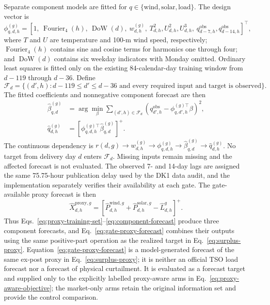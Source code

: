 \documentclass[11pt,a4paper]{article}
\begin{document}
Separate component models are fitted for
$q\in\{\mathrm{wind},\mathrm{solar},\mathrm{load}\}$.  The design vector is
\begin{equation}
  \phi^{(g)}_{q,d,h}
  =\left[1,\ \operatorname{Fourier}_4(h),\
  \operatorname{DoW}(d),\ w^{(g)}_{d,h},\
  T_{d,h}^{2},U_{d,h}^{2},U_{d,h}^{3},\
  q_{d-7,h}^{\mathrm{obs}},q_{d-14,h}^{\mathrm{obs}}\right]^{\!\top},
  \label{eq:proxy-feature-vector}
\end{equation}
where $T$ and $U$ are temperature and 100-m wind speed, respectively;
$\operatorname{Fourier}_4(h)$ contains sine and cosine terms for harmonics
one through four; and $\operatorname{DoW}(d)$ contains six weekday indicators
with Monday omitted.  Ordinary least squares is fitted only on the existing
84-calendar-day training window from $d-119$ through $d-36$.  Define
\begin{equation}
  \mathcal F_d
  =\{(d',h):d-119\leq d'\leq d-36
  \text{ and every required input and target is observed}\}.
  \label{eq:proxy-training-set}
\end{equation}
The fitted coefficients and nonnegative component forecast are then
\begin{align}
  \widehat\beta^{(g)}_{q,d}
  &=\arg\min_{\beta}\sum_{(d',h)\in\mathcal{F}_d}
  \left(q^{\mathrm{obs}}_{d',h}
  -\phi^{(g)\top}_{q,d',h}\beta\right)^2,
  \label{eq:component-ols}\\
  \widehat q^{(g)}_{d,h}
  &=\left[\phi^{(g)\top}_{q,d,h}
  \widehat\beta^{(g)}_{q,d}\right]^+.
  \label{eq:component-forecast}
\end{align}
The continuous dependency is
$r(d,g)\rightarrow w^{(g)}_{d,h}\rightarrow
\phi^{(g)}_{q,d,h}\rightarrow\widehat\beta^{(g)}_{q,d}\rightarrow
\widehat q^{(g)}_{d,h}$.  No target from delivery day $d$ enters
$\mathcal{F}_d$.  Missing inputs remain
missing and the affected forecast is not evaluated.  The observed 7- and
14-day lags are assigned the same 75.75-hour publication delay used by the DK1
data audit, and the implementation separately verifies their availability at
each gate.  The gate-available proxy
forecast is then
\begin{equation}
  \widehat X^{\mathrm{proxy},g}_{d,h}
  =\left[\widehat P^{\mathrm{wind},g}_{d,h}
  +\widehat P^{\mathrm{solar},g}_{d,h}
  -\widehat L^{g}_{d,h}\right]^+.
  \label{eq:gate-proxy-forecast}
\end{equation}
Thus Eqs.~\eqref{eq:proxy-training-set}--\eqref{eq:component-forecast} produce
three component forecasts, and Eq.~\eqref{eq:gate-proxy-forecast} combines
their outputs using the same positive-part operation as the realized target in
Eq.~\eqref{eq:surplus-proxy}.
Equation~\eqref{eq:gate-proxy-forecast} is a model-generated forecast of the
same ex-post proxy in Eq.~\eqref{eq:surplus-proxy}; it is neither an official
TSO load forecast nor a forecast of physical curtailment.  It is evaluated as
a forecast target and supplied only to the explicitly labelled proxy-aware
arms in Eq.~\eqref{eq:proxy-aware-objective}; the market-only arms retain the
original information set and provide the control comparison.
\end{document}
